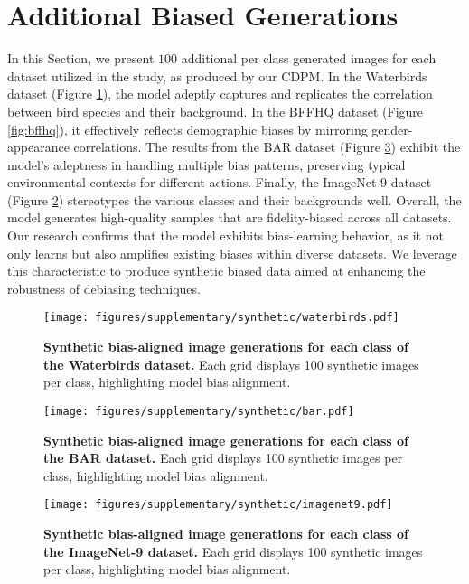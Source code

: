 \section{Additional Biased Generations}
\label{supsec:synthetic_imgs}
In this Section, we present $100$ additional per class generated images for each dataset utilized in the study, as produced by our CDPM. In the Waterbirds dataset (Figure \ref{fig:waterbirds}), the model adeptly captures and replicates the correlation between bird species and their background. In the BFFHQ dataset (Figure \ref{fig:bffhq}), it effectively reflects demographic biases by mirroring gender-appearance correlations. The results from the BAR dataset (Figure \ref{fig:bar}) exhibit the model's adeptness in handling multiple bias patterns, preserving typical environmental contexts for different actions.  Finally, the ImageNet-9 dataset (Figure \ref{fig:imagenet9}) stereotypes the various classes and their backgrounds well. Overall, the model generates high-quality samples that are fidelity-biased across all datasets. 
Our research confirms that the model exhibits bias-learning behavior, as it not only learns but also amplifies existing biases within diverse datasets. We leverage this characteristic to produce synthetic biased data aimed at enhancing the robustness of debiasing techniques.

\begin{figure}[ht]
    \centering
    \texttt{[image: figures/supplementary/synthetic/waterbirds.pdf]}
    \caption{\textbf{Synthetic bias-aligned image generations for each class of the Waterbirds dataset.} Each grid displays 100 synthetic images per class, highlighting model bias alignment.}
    \label{fig:waterbirds}
\end{figure}

\begin{figure}[ht]
    \centering
    \texttt{[image: figures/supplementary/synthetic/bar.pdf]}
    \caption{\textbf{Synthetic bias-aligned image generations for each class of the BAR dataset.} Each grid displays 100 synthetic images per class, highlighting model bias alignment.}
    \label{fig:imagenet9}
\end{figure}




\begin{figure}[htbp]
    \centering
    \texttt{[image: figures/supplementary/synthetic/imagenet9.pdf]}
    \caption{\textbf{Synthetic bias-aligned image generations for each class of the ImageNet-9 dataset.} Each grid displays 100 synthetic images per class, highlighting model bias alignment.}
    \label{fig:bar}
\end{figure}

